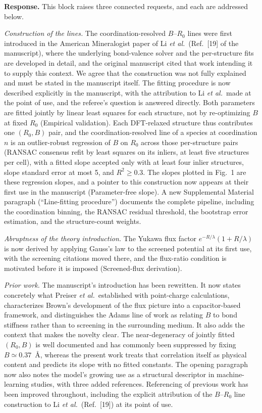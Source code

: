 \documentclass[11pt]{article}
\begin{document}
\textbf{Response.}  This block raises three connected requests, and each
are addressed below.

\emph{Construction of the lines.}  The coordination-resolved
$B$--$R_0$ lines were first introduced in the American Mineralogist
paper of Li \emph{et al.}\ (Ref.~[19] of the manuscript), where the
underlying bond-valence solver and the per-structure fits are
developed in detail, and the original manuscript cited that work
intending it to supply this context.  We agree that the construction
was not fully explained and must be stated in the manuscript itself.  
The fitting procedure is now described explicitly in the manuscript, 
with the attribution to Li \emph{et al.}\ made at the point 
of use, and the referee's question is answered directly.  
Both parameters are fitted jointly by linear least squares for each structure, not by
re-optimizing $B$ at fixed $R_0$ (Empirical validation).  Each
DFT-relaxed structure thus contributes one $(R_0,B)$ pair, and the
coordination-resolved line of a species at coordination $n$ is an
outlier-robust regression of $B$ on $R_0$ across those per-structure
pairs (RANSAC consensus refit by least squares on its inliers, at
least five structures per cell), with a fitted slope accepted only
with at least four inlier structures, slope standard error at most 5,
and $R^2\ge 0.3$.  The slopes plotted in Fig.~1 are these regression
slopes, and a pointer to this construction now appears at their first
use in the manuscript (Parameter-free slope).  A new Supplemental
Material paragraph (``Line-fitting procedure'') documents the
complete pipeline, including the coordination binning, the RANSAC
residual threshold, the bootstrap error estimation, and the
structure-count weights.

\emph{Abruptness of the theory introduction.}  The Yukawa flux factor
$e^{-R/\lambda}(1+R/\lambda)$ is now derived by applying Gauss's law
to the screened potential at its first use, with the screening
citations moved there, and the flux-ratio condition is motivated
before it is imposed (Screened-flux derivation).

\emph{Prior work.}  The manuscript's introduction has been rewritten.
It now states concretely what Preiser \emph{et al.}\ established with
point-charge calculations, characterizes Brown's development of the
flux picture into a capacitor-based framework, and distinguishes the
Adams line of work as relating $B$ to bond stiffness rather than to
screening in the surrounding medium.  It also adds the context that
makes the novelty clear.  The near-degeneracy of jointly fitted
$(R_0,B)$ is well documented and has commonly been suppressed by
fixing $B\simeq0.37$~\AA, whereas the present work treats that
correlation itself as physical content and predicts its slope with no
fitted constants.  The opening paragraph now also notes the model's
growing use as a structural descriptor in machine-learning studies,
with three added references.  Referencing of previous work has been
improved throughout, including the explicit attribution of the
$B$--$R_0$ line construction to Li \emph{et al.}\ (Ref.~[19]) at its
point of use.
\end{document}
